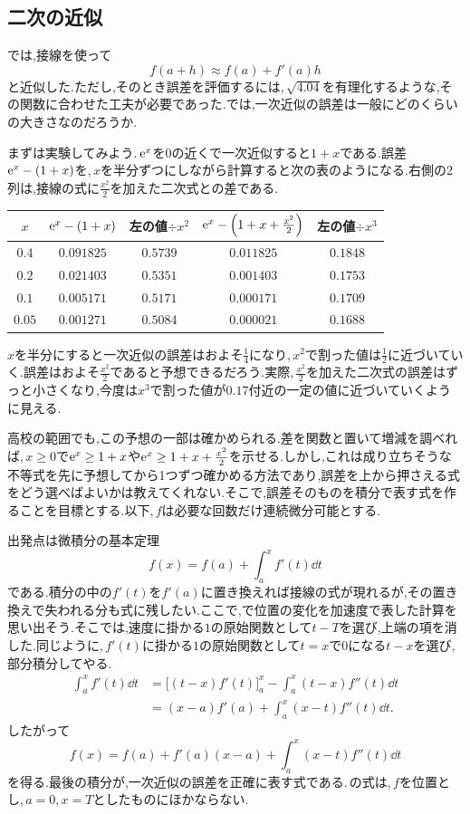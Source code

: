 \subsection{二次の近似}

では,接線を使って
\[
 f(a+h)\approx f(a)+f'(a)h
\]
と近似した.ただし,そのとき誤差を評価するには,\,$\sqrt{4.04}$を有理化するような,その関数に合わせた工夫が必要であった.では,一次近似の誤差は一般にどのくらいの大きさなのだろうか.

まずは実験してみよう.\,$\mathrm{e}^x$を$0$の近くで一次近似すると$1+x$である.誤差$\mathrm{e}^x-(1+x)$を,\,$x$を半分ずつにしながら計算すると次の表のようになる.右側の2列は,接線の式に$\frac{x^2}{2}$を加えた二次式との差である.
\begin{center}
\begin{tabular}{ccccc}
\toprule
$x$ & $\mathrm{e}^x-(1+x)$ & 左の値$\div x^2$ & $\mathrm{e}^x-\left(1+x+\frac{x^2}{2}\right)$ & 左の値$\div x^3$\\
\midrule
$0.4$ & $0.091825$ & $0.5739$ & $0.011825$ & $0.1848$\\
$0.2$ & $0.021403$ & $0.5351$ & $0.001403$ & $0.1753$\\
$0.1$ & $0.005171$ & $0.5171$ & $0.000171$ & $0.1709$\\
$0.05$ & $0.001271$ & $0.5084$ & $0.000021$ & $0.1688$\\
\bottomrule
\end{tabular}
\end{center}
$x$を半分にすると一次近似の誤差はおよそ$\frac14$になり,\,$x^2$で割った値は$\frac12$に近づいていく.誤差はおよそ$\frac{x^2}{2}$であると予想できるだろう.実際,\,$\frac{x^2}{2}$を加えた二次式の誤差はずっと小さくなり,今度は$x^3$で割った値が$0.17$付近の一定の値に近づいていくように見える.

高校の範囲でも,この予想の一部は確かめられる.差を関数と置いて増減を調べれば,\,$x\ge0$で$\mathrm{e}^x\ge1+x$や$\mathrm{e}^x\ge1+x+\frac{x^2}{2}$を示せる.しかし,これは成り立ちそうな不等式を先に予想してから1つずつ確かめる方法であり,誤差を上から押さえる式をどう選べばよいかは教えてくれない.そこで,誤差そのものを積分で表す式を作ることを目標とする.以下,\,$f$は必要な回数だけ連続微分可能とする.

出発点は微積分の基本定理
\[
 f(x)=f(a)+\int_a^x f'(t)\dd t
\]
である.積分の中の$f'(t)$を$f'(a)$に置き換えれば接線の式が現れるが,その置き換えで失われる分も式に残したい.ここで,で位置の変化を加速度で表した計算を思い出そう.そこでは,速度に掛かる$1$の原始関数として$t-T$を選び,上端の項を消した.同じように,\,$f'(t)$に掛かる$1$の原始関数として$t=x$で$0$になる$t-x$を選び,部分積分してやる.
\begin{align*}
 \int_a^x f'(t)\dd t
 &=\bigl[(t-x)f'(t)\bigr]_a^x-\int_a^x(t-x)f''(t)\dd t\\
 &=(x-a)f'(a)+\int_a^x(x-t)f''(t)\dd t.
\end{align*}
したがって
\[
 f(x)=f(a)+f'(a)(x-a)+\int_a^x(x-t)f''(t)\dd t
\]
を得る.最後の積分が,一次近似の誤差を正確に表す式である.\,の式は,\,$f$を位置とし,\,$a=0$,\,$x=T$としたものにほかならない.

